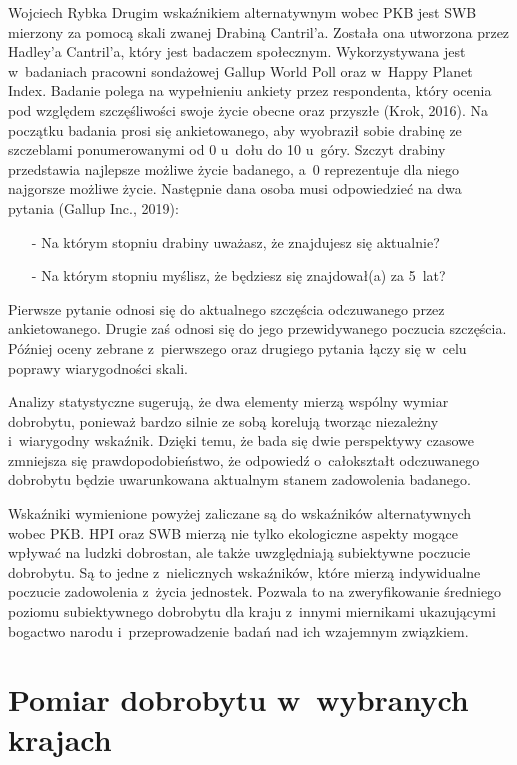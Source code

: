 \begin{artplenv}{Wojciech Rybka}
Drugim wskaźnikiem alternatywnym wobec PKB jest SWB mierzony za pomocą skali zwanej Drabiną Cantril’a. Została ona
utworzona przez Hadley’a Cantril’a, który jest badaczem społecznym. Wykorzystywana jest w~badaniach pracowni sondażowej
Gallup World Poll oraz w~Happy Planet Index. Badanie polega na wypełnieniu ankiety przez respondenta, który ocenia pod
względem szczęśliwości swoje życie obecne oraz przyszłe \label{ref:RND66wMsg1fRT}(Krok, 2016). Na początku badania
prosi się ankietowanego, aby wyobraził sobie drabinę ze szczeblami ponumerowanymi od 0 u~dołu do 10 u~góry. Szczyt
drabiny przedstawia najlepsze możliwe życie badanego, a~0 reprezentuje dla niego najgorsze możliwe życie. Następnie
dana osoba musi odpowiedzieć na dwa pytania \label{ref:RNDAHBjpftqSZ}(Gallup Inc., 2019):

\begin{itemize}
	\item[-] Na którym stopniu drabiny uważasz, że znajdujesz się aktualnie?
	\item[-] Na którym stopniu myślisz, że będziesz się znajdował(a) za 5~lat?
\end{itemize}

Pierwsze pytanie odnosi się do aktualnego szczęścia odczuwanego przez ankietowanego. Drugie zaś odnosi się do jego
przewidywanego poczucia szczęścia. Później oceny zebrane z~pierwszego oraz drugiego pytania łączy się w~celu poprawy
wiarygodności skali. 

Analizy statystyczne sugerują, że dwa elementy mierzą wspólny wymiar dobrobytu, ponieważ bardzo silnie ze sobą korelują
tworząc niezależny i~wiarygodny wskaźnik. Dzięki temu, że bada się dwie perspektywy czasowe zmniejsza się
prawdopodobieństwo, że odpowiedź o~całokształt odczuwanego dobrobytu będzie uwarunkowana aktualnym stanem zadowolenia
badanego.

Wskaźniki wymienione powyżej zaliczane są do wskaźników alternatywnych wobec PKB. HPI oraz SWB mierzą nie tylko
ekologiczne aspekty mogące wpływać na ludzki dobrostan, ale także uwzględniają subiektywne poczucie dobrobytu. Są to
jedne z~nielicznych wskaźników, które mierzą indywidualne poczucie zadowolenia z~życia jednostek. Pozwala to na
zweryfikowanie średniego poziomu subiektywnego dobrobytu dla kraju z~innymi miernikami ukazującymi bogactwo
narodu i~przeprowadzenie badań nad ich wzajemnym związkiem. 

\section{Pomiar dobrobytu w~wybranych krajach}

\end{artplenv}
